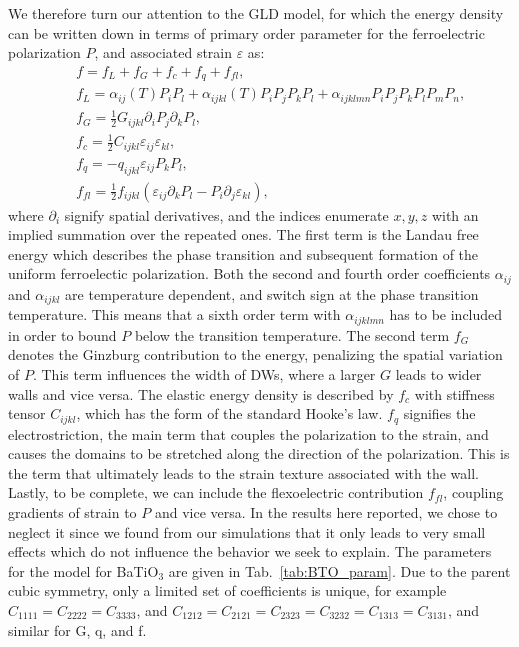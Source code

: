 We therefore turn our attention to the GLD model, for which the energy density can be written down in terms of primary order parameter for the ferroelectric polarization $P$, and associated strain $\varepsilon$ as:
\begin{eqnarray}\label{eq:BTO_energy}
&&f = f_{L}+f_{G}+f_{c}+f_{q}+f_{fl},\\
&&f_{L} = \alpha_{ij}(T)P_iP_l + \alpha_{ijkl}(T)P_{i}P_{j}P_{k}P_{l} + \alpha_{ijklmn} P_i P_j P_k P_l P_m P_n,\\
&&f_{G} = \frac{1}{2}G_{ijkl}\partial_i P_j\partial_k P_l,\\
&&f_{c} = \frac{1}{2}C_{ijkl}\varepsilon_{ij}\varepsilon_{kl},\\
&&f_{q}= - q_{ijkl}\varepsilon_{ij}P_{k}P_{l},\label{eq:qpp}\\
&&f_{fl}=\frac{1}{2}f_{ijkl}(\varepsilon_{ij}\partial_k P_l - P_i\partial_j\varepsilon_{kl}),
\end{eqnarray}
where $\partial_i$ signify spatial derivatives, and the indices enumerate ${x,y,z}$ with an implied summation over the repeated ones.
The first term is the Landau free energy which describes the phase transition and subsequent formation of the uniform ferroelectic polarization.
Both the second and fourth order coefficients $\alpha_{ij}$ and $\alpha_{ijkl}$ are temperature dependent, and switch sign at the phase transition temperature.
This means that a sixth order term with $\alpha_{ijklmn}$ has to be included in order to bound $P$ below the transition temperature.
The second term $f_G$ denotes the Ginzburg contribution to the energy, penalizing the spatial variation of $P$.  
This term influences the width of DWs, where a larger $G$ leads to wider walls and vice versa.
The elastic energy density is described by $f_c$ with stiffness tensor $C_{ijkl}$, which has the form of the standard Hooke's law.
$f_q$ signifies the electrostriction, the main term that couples the polarization to the strain, and causes the domains to be stretched along the direction of the polarization.
This is the term that ultimately leads to the strain texture associated with the wall.
Lastly, to be complete, we can include the flexoelectric contribution $f_{fl}$, coupling gradients of strain to $P$ and vice versa.
In the results here reported, we chose to neglect it since we found from our simulations that it only leads to very small effects which do not influence the behavior we seek to explain.
The parameters for the model for BaTiO$_3$ are given in Tab.~\ref{tab:BTO_param}.
Due to the parent cubic symmetry, only a limited set of coefficients is unique, for example $C_{1111} = C_{2222} = C_{3333}$, and $C_{1212} = C_{2121} = C_{2323} = C_{3232} = C_{1313} = C_{3131}$, and similar for G, q, and f. 

